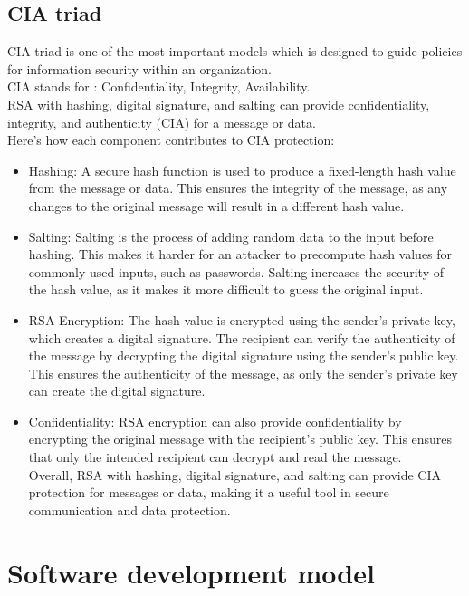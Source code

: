 \subsection{CIA triad}
CIA triad is one of the most important models which is designed to guide policies
for information security within an organization.\\
CIA stands for :
Confidentiality,
Integrity,
Availability.\\
RSA with hashing, digital signature, and salting can provide confidentiality, integrity, and authenticity (CIA) for a message or data. \\
Here's how each component contributes to CIA protection:
\begin{itemize}
	\item Hashing: A secure hash function is used to produce a fixed-length hash value from the message or data.
	      This ensures the integrity of the message, as any changes to the original message will result in a different hash value.
	\item Salting: Salting is the process of adding random data to the input before hashing.
	      This makes it harder for an attacker to precompute hash values for commonly used inputs, such as passwords.
	      Salting increases the security of the hash value, as it makes it more difficult to guess the original input.
	\item RSA Encryption: The hash value is encrypted using the sender's private key, which creates a digital signature.
	      The recipient can verify the authenticity of the message by decrypting the digital signature using the sender's public key.
	      This ensures the authenticity of the message, as only the sender's private key can create the digital signature.
	\item Confidentiality: RSA encryption can also provide confidentiality by encrypting the original message with the recipient's public key.
	      This ensures that only the intended recipient can decrypt and read the message.\\

	      Overall, RSA with hashing, digital signature, and salting can provide CIA protection for messages or data, making it a useful tool in secure communication and data protection.
\end{itemize}






\pagebreak
\section{Software development model}
